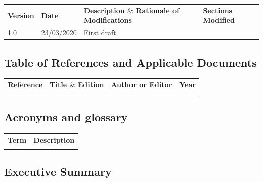 \documentclass[12pt]{article}
\begin{document}
\begin{table}[H]
\large
\centering
\begin{adjustbox}{width=\textwidth}
\begin{tabular}{ |p{1.5cm}|p{2.5cm}|p{9.0cm}|p{3.0cm}| }
\hhline{----}
\textbf{Version} & \textbf{Date} & \textbf{Description  $  \&  $  Rationale of
Modifications} & \textbf{Sections Modified} \\
\hhline{----}
1.0 & 23/03/2020 & First draft &  \\ 
\hline
\end{tabular}
\end{adjustbox}
\end{table}

\subsection{Table of References and Applicable Documents}

\begin{table}[H]
\large
\centering
\begin{adjustbox}{width=\textwidth}
\begin{tabular}{ |p{2.66in}|p{2.66in}|p{0.95in}|p{0.43in}| }
\hhline{----}
\textbf{Reference} & \textbf{Title  $  \&  $  Edition} & \textbf{Author or
Editor} & \textbf{Year}
\\
\hhline{----}
 &  &  &  \\ 
\hline
\end{tabular}
\end{adjustbox}
\end{table}

\subsection{Acronyms and glossary}

\begin{table}[H]
\large
\centering
\begin{adjustbox}{width=\textwidth}
\begin{tabular}{ |p{1.24in}|p{5.45in}| }
\hhline{--}
\textbf{Term} & \textbf{Description} \\ 
\hhline{--}
 &  \\ 
\hline
\end{tabular}
\end{adjustbox}
\end{table}

\subsection{Executive Summary}
\end{document}

